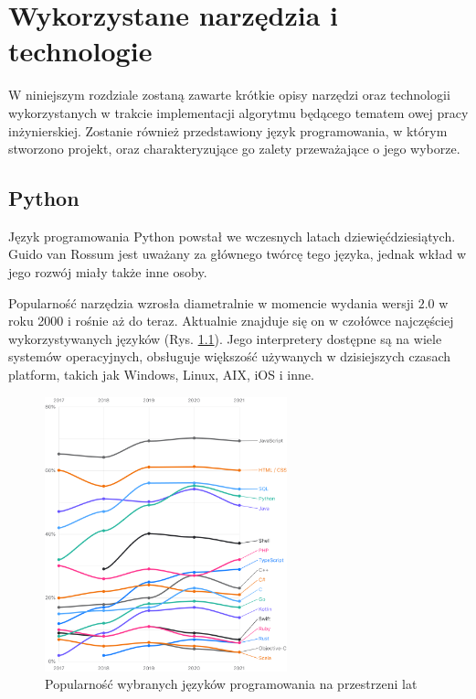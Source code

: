 \chapter{Wykorzystane narzędzia i technologie}
\label{cha:wykorzystaneNarzedziaITechnologie}
W niniejszym rozdziale zostaną zawarte krótkie opisy narzędzi oraz technologii wykorzystanych w trakcie implementacji algorytmu będącego tematem owej pracy inżynierskiej. Zostanie również przedstawiony język programowania, w którym stworzono projekt, oraz charakteryzujące go zalety przeważające o jego wyborze. 


\section{Python}
Język programowania Python \cite{PythonWiki} powstał we wczesnych latach dziewięćdziesiątych. Guido van Rossum jest uważany za głównego twórcę tego języka, jednak wkład w jego rozwój miały także inne osoby. 

Popularność narzędzia wzrosła diametralnie w momencie wydania wersji $2.0$ w roku 2000 i rośnie aż do teraz. Aktualnie znajduje się on w czołówce najczęściej wykorzystywanych języków (Rys. \ref{fig:programmingLang}). Jego interpretery dostępne są na wiele systemów operacyjnych, obsługuje większość używanych w dzisiejszych czasach platform, takich jak Windows, Linux, AIX, iOS i inne.

\begin{figure}[h]
	\centering
	\includegraphics[width=7cm]{zdjęcia/python.png}
	\caption{Popularność wybranych języków programowania na przestrzeni lat \cite{pythonLanguages}} 
	\label{fig:programmingLang}
\end{figure}

